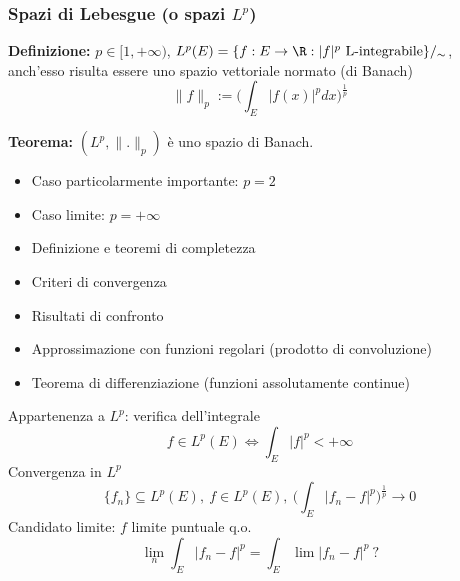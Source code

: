 \subsubsection{Spazi di Lebesgue (o spazi $L^p$)}
\begin{tcolorbox}
	\textbf{Definizione:} $p\in[1,+\infty)$, $L^p(E)=\{f:E\to \R:|f|^p\text{ L-integrabile}\}/_{\sim}$, anch'esso risulta essere uno spazio vettoriale normato (di Banach)
	\[\|f\|_p:=\bigg(\int_{E}^{} |f(x)|^pdx\bigg)^{\frac{1}{p}}\] 
\end{tcolorbox}
\begin{tcolorbox}
	\textbf{Teorema:} $(L^p,\|.\|_p)$ è uno spazio di Banach.
\end{tcolorbox}
\begin{itemize}
	\item Caso particolarmente importante: $p=2$
	\item Caso limite: $p=+\infty$
\end{itemize}

\begin{itemize}
	\item Definizione e teoremi di completezza
	\item Criteri di convergenza
	\item Risultati di confronto
	\item Approssimazione con funzioni regolari (prodotto di convoluzione)
	\item Teorema di differenziazione (funzioni assolutamente continue)
\end{itemize}
Appartenenza a $L^p$: verifica dell'integrale
\[f\in L^p(E) \iff \int_{E}^{} |f|^p<+\infty\]
Convergenza in $L^p$
\[\{f_n\} \subseteq L^p(E),\ f\in L^p(E),\  \bigg(\int_{E}^{} |f_n-f|^p\bigg)^{\frac{1}{p}}\to 0\]
Candidato limite: $f$ limite puntuale q.o.
\[\lim_n \int_E|f_n-f|^p=\int_{E}^{} \lim |f_n-f|^p \ ?\] 
